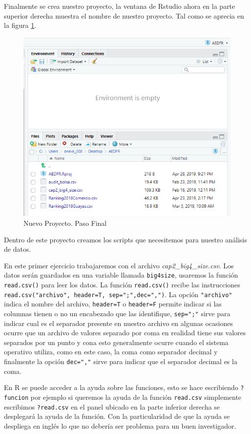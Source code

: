 \documentclass[letterpaper,]{book}
\begin{document}
Finalmente se crea nuestro proyecto, la ventana de Rstudio ahora en la parte superior derecha muestra el nombre de nuestro proyecto. Tal como se aprecia en la figura \ref{fig:project4}.

\begin{figure}[!h]

{\centering \includegraphics[width=0.4\linewidth]{project4} 

}

\caption{Nuevo Proyecto. Paso Final}\label{fig:project4}
\end{figure}

Dentro de este proyecto creamos los scripts que necesitemos para nuestro análisis de datos.

En este primer ejercicio trabajaremos con el archivo \emph{cap2\_big4\_size.csv}. Los datos serán guardados en una variable llamada \texttt{big4size}, usaremos la función \texttt{read.csv()} para leer los datos. La función \texttt{read.csv()} recibe las instrucciones \texttt{read.csv("archivo",\ header=T,\ sep=";",dec=",")}. La opción \texttt{"archivo"} indica el nombre del archivo, \texttt{header=T} o \texttt{header=F} permite indicar si las columnas tienen o no un encabezado que las identifique, \texttt{sep=";"} sirve para indicar cual es el separador presente en nuestro archivo en algunas ocasiones ocurre que un archivo de valores separado por coma en realidad tiene sus valores separados por un punto y cona esto generalmente ocurre cuando el sistema operativo utiliza, como en este caso, la coma como separador decimal y finalmente la opción \texttt{dec=","} sirve para indicar que el separador decimal es la coma.

En R se puede acceder a la ayuda sobre las funciones, esto se hace escribiendo \texttt{?funcion} por ejemplo si queremos la ayuda de la función \texttt{read.csv} simplemente escribimos \texttt{?read.csv} en el panel ubicado en la parte inferior derecha se desplegará la ayuda de la función. Con la particularidad de que la ayuda se despliega en inglés lo que no debería ser problema para un buen investigador.
\end{document}

